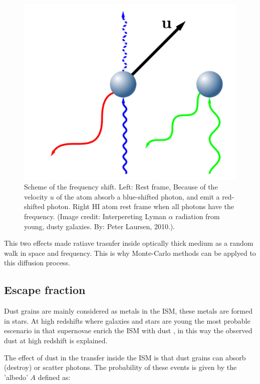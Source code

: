\begin{figure}[H]
\begin{center}
\includegraphics[scale=0.4]{../Figures/xshift.png}
\end{center}\caption{Scheme of the frequency shift. Left: Rest frame, Because 
of the velocity $u$ of the atom absorb a blue-shifted \ly photon, and emit 
a red-shifted \ly photon. Right HI atom rest frame when all photons have the \ly frequency. (Image credit: Interpereting Lyman $\alpha$ radiation from young, dusty galaxies. By: Peter Laursen, 2010.).\label{fig:xshift}}
\end{figure}


This two effects made ratiave trasnfer inside optically thick medium as a random 
walk in space and frequency. This is why Monte-Carlo methods can be
applyed to this diffusion process.
 
\subsection{Escape fraction}\label{sec:ef}

Dust grains are mainly considered as metals in the ISM, these
metals are formed in stars. At high redshifts where galaxies and 
stars are young the most probable escenario in that supernovae 
enrich the ISM with dust \citep{Kotak09}, in this way the observed 
dust \citep{Coppin09}  at high redshift is explained. 

The effect of dust in the \ly transfer inside the ISM is that 
dust grains can absorb (destroy) or scatter \ly photons. The 
probability of these events is given by the 'albedo' $A$ defined as:


